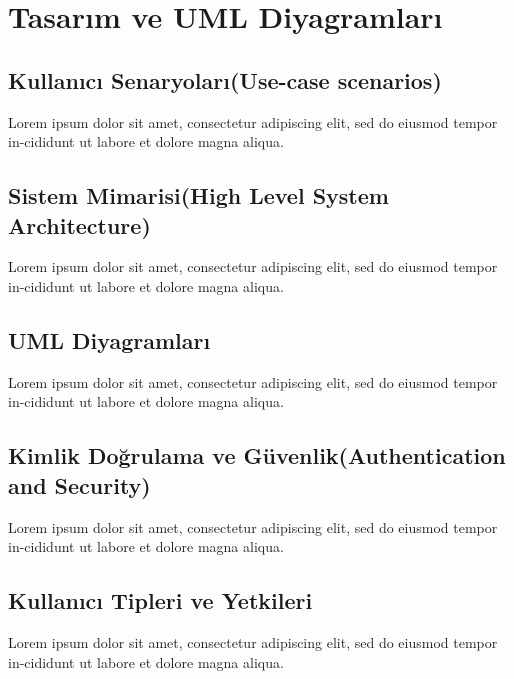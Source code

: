 \section{Tasarım ve UML Diyagramları}


\subsection{Kullanıcı Senaryoları(Use-case scenarios)}
Lorem  ipsum  dolor  sit  amet,  consectetur  adipiscing  elit,  sed  do  eiusmod  tempor  in-cididunt  ut  labore  et  dolore  magna  aliqua. 
\subsection{Sistem Mimarisi(High Level System Architecture)}
Lorem  ipsum  dolor  sit  amet,  consectetur  adipiscing  elit,  sed  do  eiusmod  tempor  in-cididunt  ut  labore  et  dolore  magna  aliqua. 
\subsection{UML Diyagramları}
Lorem  ipsum  dolor  sit  amet,  consectetur  adipiscing  elit,  sed  do  eiusmod  tempor  in-cididunt  ut  labore  et  dolore  magna  aliqua. 
\subsection{Kimlik Doğrulama ve Güvenlik(Authentication and Security)}
Lorem  ipsum  dolor  sit  amet,  consectetur  adipiscing  elit,  sed  do  eiusmod  tempor  in-cididunt  ut  labore  et  dolore  magna  aliqua. 
\subsection{Kullanıcı Tipleri ve Yetkileri}
Lorem  ipsum  dolor  sit  amet,  consectetur  adipiscing  elit,  sed  do  eiusmod  tempor  in-cididunt  ut  labore  et  dolore  magna  aliqua. 

